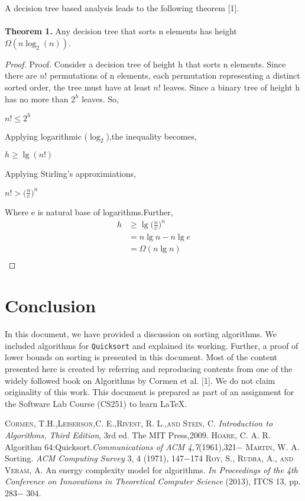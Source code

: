 \documentclass[a4paper, 10pt,twocolumn]{article}
\begin{document}
A decision tree based analysis leads to the following theorem [1].
\\\\\textbf{Theorem 1.} Any decision tree that sorts n elements has height $\Omega(n\log_2 (n))$.
\begin{proof}
Proof. Consider a decision tree of height h that sorts n elements. Since there are $n!$ permutations of n elements, each permutation representing a distinct sorted order, the tree must have at least $n!$ leaves. Since a binary tree of height h has no more than $2^h$ leaves. So,
\begin{flushleft}
$n! \leq 2^h$\\
\end{flushleft}
Applying logarithmic ($\log_2$),the inequality becomes,
\begin{flushleft}
$h \geq \lg (n!)$\\
\end{flushleft}
Applying Stirling's approximiations,
\begin{flushleft}
$n! > \Big(\frac{n}{e}\Big)^n$\\
\end{flushleft}
Where e is natural base of logarithms.Further,
\begin{align*}
  h  & \geq \lg \Big(\frac{n}{e} \Big)^n \\
   &=n\lg n-n\lg e \\
   &=\Omega(n\lg n) \\
\end{align*}
\end{proof}
\section{Conclusion}
\noindent
In this document, we have provided a discussion
on sorting algorithms. We included algorithms for
\texttt{Quicksort} and explained its working. Further, a
proof of lower bounds on sorting is presented in this
document. Most of the content presented here is
created by referring and reproducing contents from
one of the widely followed book on Algorithms by Cormen et al. [1]. We do not claim originality of this work. This document is prepared as part of an assignment for the Software Lab Course (CS251) to learn \LaTeX .
\begin{thebibliography}{25}
   {\scshape Cormen, T.H.,Leiserson,C. E.,Rivest, R. L.,and Stein, C.} \textit{Introduction to Algorithms, Third Edition}, 3rd ed. The MIT Press,2009.
   \textsc{Hoare, C. A. R.} Algorithm 64:Quicksort.\textit{Communications of ACM 4,7}(1961),321$-$
  \bibitem{} {\scshape Martin, W. A.} Sorting. \textit{ACM Computing Survey} 3, 4 (1971), 147$-$174
  \bibitem{} \textsc{Roy, S., Rudra, A., and Veram, A.} An energy complexity model for algorithms. \textit{In Proceedings of the 4th Conference on Innovations in Theoretical Computer Science }(2013), ITCS 13, pp. 283$-$ 304.
\end{thebibliography}
\end{document}
